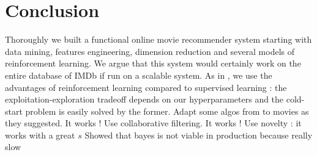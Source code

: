 \documentclass[letterpaper]{article}
\begin{document}


\section{Conclusion}

Thoroughly we built a functional online movie recommender system starting with data mining, features engineering, dimension reduction and several models of reinforcement learning. We argue that this system would certainly work on the entire database of IMDb if run on a scalable system.
As in \cite{main}, we use the advantages of reinforcement learning compared to supervised learning : the exploitation-exploration tradeoff depends on our hyperparameters and the cold-start problem is easily solved by the former.
Adapt some algos from \cite{main} to movies as they suggested. It works !
Use collaborative filtering. It works !
Use novelty : it works with a great $s$
Showed that bayes is not viable in production because really slow

\footnotesize


\end{document}
